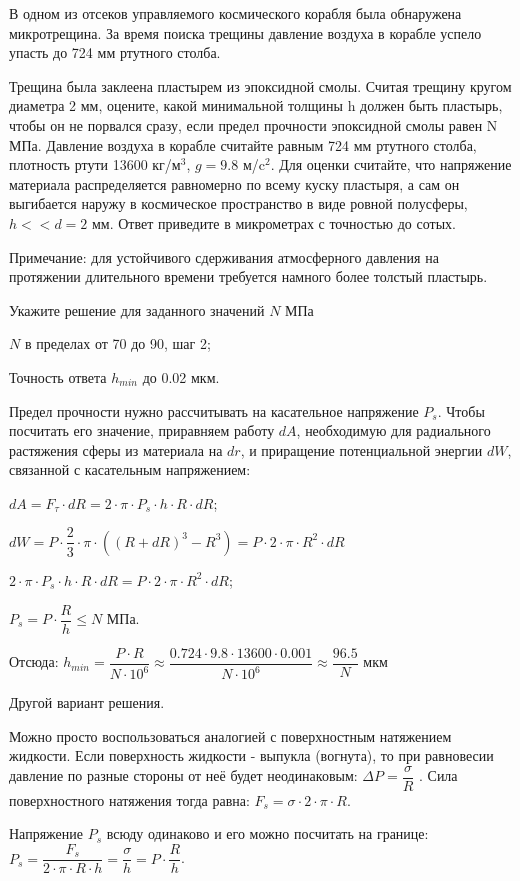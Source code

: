 
В одном из отсеков управляемого космического
корабля была обнаружена микротрещина. За время поиска трещины давление воздуха в
корабле успело упасть до 724 мм ртутного столба. 

Трещина была заклеена
пластырем из эпоксидной смолы. Считая трещину кругом диаметра 2 мм, оцените,
какой минимальной толщины h
должен быть пластырь, чтобы он не порвался сразу, если предел прочности
эпоксидной смолы равен N МПа. Давление воздуха в корабле считайте равным 724 мм ртутного столба, плотность ртути 13600 кг/м$^3$, $g=9.8$ м/c$^2$. Для оценки считайте, что напряжение материала распределяется равномерно по всему
куску пластыря, а сам он выгибается наружу в космическое пространство в виде
ровной полусферы,  $h << d = 2$ мм. Ответ приведите в микрометрах с точностью до сотых.

Примечание:
для устойчивого сдерживания атмосферного давления на протяжении длительного
времени требуется намного более толстый пластырь.

Укажите решение для заданного значений $N$ МПа

\paramSection

$N$ в пределах от 70 до 90, шаг 2;         

Точность ответа  $h_{min}$  до  0.02 мкм.

\soultionSection

Предел прочности нужно рассчитывать на касательное напряжение $P_s$. Чтобы посчитать его значение, 
приравняем работу $dA$, необходимую для радиального растяжения сферы из материала на $dr$, и приращение 
потенциальной энергии $dW$, связанной с касательным напряжением:

$dA=F_{\tau} \cdot dR=2 \cdot \pi \cdot P_s \cdot h \cdot R \cdot dR$; 

$dW=P \cdot \dfrac{2}{3} \cdot \pi \cdot ((R+dR)^3-R^3 )=P \cdot 2 \cdot \pi \cdot R^2 \cdot dR$ 

$2 \cdot \pi \cdot P_s \cdot h \cdot R \cdot dR=P \cdot 2 \cdot \pi \cdot R^2 \cdot dR$; 

$ P_s=P \cdot \dfrac{R}{h} \leq N$ МПа.  

Отсюда:
$h_{min}=\dfrac{P \cdot R}{N \cdot 10^6} \approx \dfrac{0.724 \cdot 9.8 \cdot 13600 \cdot 0.001}{N \cdot 10^6} \approx \dfrac{96.5}{N}$  мкм

Другой вариант решения.

Можно просто воспользоваться аналогией с поверхностным натяжением жидкости. 
Если поверхность жидкости - выпукла (вогнута), то при равновесии давление по разные стороны от 
неё будет неодинаковым:  $\Delta P= \dfrac{\sigma}{R}$ . Сила поверхностного натяжения тогда равна: 
$F_s= \sigma  \cdot 2 \cdot \pi \cdot R$.

Напряжение $P_s$ всюду одинаково и его можно посчитать на границе:  
$P_s=\dfrac{F_s}{2 \cdot \pi \cdot R \cdot h}= \dfrac{\sigma}{h}=P \cdot \dfrac{R}{h}$.


